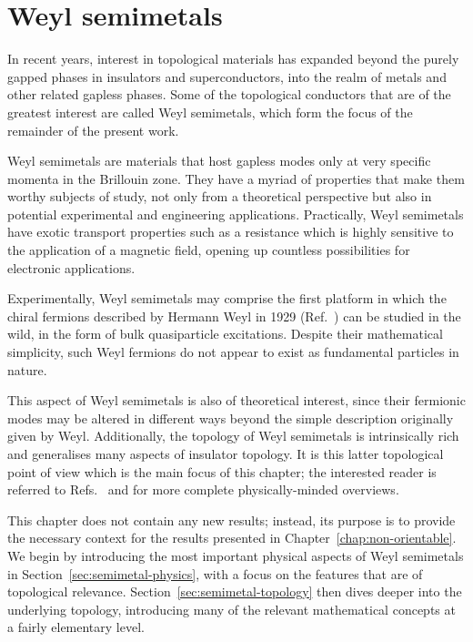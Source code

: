 \chapter{Weyl semimetals}\label{chap:WSM}

In recent years, interest in topological materials has expanded beyond the purely gapped phases in insulators and superconductors, into the realm of metals and other related gapless phases. Some of the topological conductors that are of the greatest interest are called Weyl semimetals, which form the focus of the remainder of the present work.

Weyl semimetals are materials that host gapless modes only at very specific momenta in the Brillouin zone. They have a myriad of properties that make them worthy subjects of study, not only from a theoretical perspective but also in potential experimental and engineering applications. Practically, Weyl semimetals have exotic transport properties such as a resistance which is highly sensitive to the application of a magnetic field, opening up countless possibilities for electronic applications. 

Experimentally, Weyl semimetals may comprise the first platform in which the chiral fermions described by Hermann Weyl in 1929 (Ref.~\cite{Weyl_fermions}) can be studied in the wild, %
in the form of bulk quasiparticle excitations. Despite their mathematical simplicity, such Weyl fermions do not appear to exist as fundamental particles in nature.

This aspect of Weyl semimetals is also of theoretical interest, since their fermionic modes may be altered in different ways beyond the simple description originally given by Weyl. Additionally, the topology of Weyl semimetals is intrinsically rich and generalises many aspects of insulator topology. It is this latter topological point of view which is the main focus of this chapter; the interested reader is referred to Refs.~\cite{Armitage_WSM-review} and \cite{Hosur_WSM-transport} for more complete physically-minded overviews.

This chapter does not contain any new results; instead, its purpose is to provide the necessary context for the results presented in Chapter~\ref{chap:non-orientable}. We begin by introducing the most important physical aspects of Weyl semimetals in Section~\ref{sec:semimetal-physics}, with a focus on the features that are of topological relevance. Section~\ref{sec:semimetal-topology} then dives deeper into the underlying topology, introducing many of the relevant mathematical concepts at a fairly elementary level.

